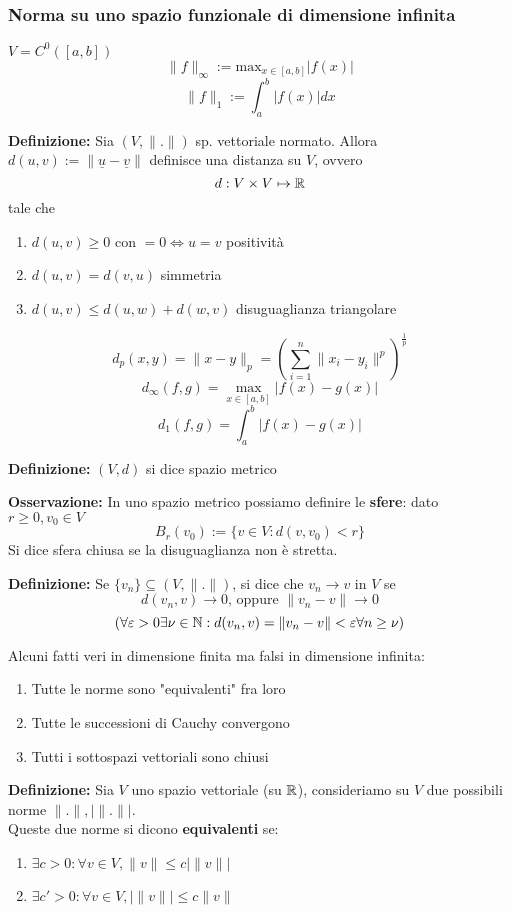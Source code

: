 \subsubsection{Norma su uno spazio funzionale di dimensione infinita}
$V=C^0([a,b])$
\[\|f\|_\infty:=\text{max}_{x\in[a,b]}|f(x)|\]
\[\|f\|_1:=\int_{a}^{b} |f(x)|dx\]
\begin{tcolorbox}	
\textbf{Definizione:} Sia $(V,\|.\|)$ sp. vettoriale normato. Allora $d(u,v):=\|\underline{u}-\underline{v}\|$ definisce una distanza su $V$, ovvero
\[d:V\times V\mapsto \mathbb{R}\]
tale che
\begin{enumerate}
	\item $d(u,v)\ge 0$ con $=0\iff u=v$ positività
	\item $d(u,v)=d(v,u)$ simmetria
	\item $d(u,v)\le d(u,w)+d(w,v)$ disuguaglianza triangolare
\end{enumerate}
\end{tcolorbox}
\[d_p(x,y)=\|x-y\|_p=(\sum_{i=1}^{n} \|x_i-y_i\|^p)^{\frac{1}{p}}\]
\[d_\infty(f,g)=\max_{x\in[a,b]}|f(x)-g(x)|\]
\[d_1(f,g)=\int_{a}^{b} |f(x)-g(x)|\]
\begin{tcolorbox}
	\textbf{Definizione:} $(V,d)$ si dice spazio metrico
\end{tcolorbox}
\textbf{Osservazione:} In uno spazio metrico possiamo definire le \textbf{sfere}: dato $r\ge 0,v_0\in V$
\[B_r(v_0):=\{v\in V:d(v,v_0)<r\} \]
Si dice sfera chiusa se la disuguaglianza non è stretta.\\
\begin{tcolorbox}	
\textbf{Definizione:} Se $\{v_n\} \subseteq  (V,\|.\|)$, si dice che $v_n\to v$ in $V$ se
\[d(v_n,v)\to 0\text{, oppure }\|v_n-v\|\to 0\]
\[(\forall \varepsilon>0\exists \nu\in\mathbb{N}:d(v_n,v)=\|v_n-v\|<\varepsilon\forall n\ge \nu)\]
\end{tcolorbox}
Alcuni fatti veri in dimensione finita ma falsi in dimensione infinita:
\begin{enumerate}
	\item Tutte le norme sono "equivalenti" fra loro
	\item Tutte le successioni di Cauchy convergono
	\item Tutti i sottospazi vettoriali sono chiusi
\end{enumerate}
\begin{tcolorbox}
\textbf{Definizione:} Sia $V$ uno spazio vettoriale (su $\mathbb{R}$), consideriamo su $V$ due possibili norme $ \|.\|,|\|.\||$.
\\Queste due norme si dicono \textbf{equivalenti} se:
\begin{enumerate}
	\item $\exists c>0:\forall v\in V,\|v\|\le c|\|v\||$
	\item $\exists c'>0:\forall v\in V,|\|v\||\le c\|v\|$
\end{enumerate}
\end{tcolorbox}
